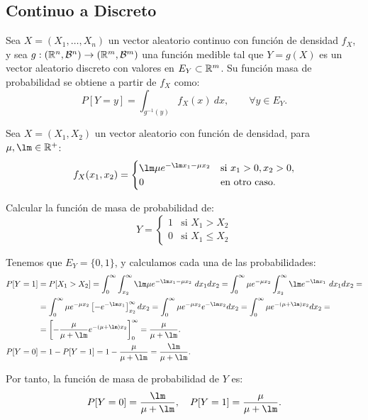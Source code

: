 \subsection{Continuo a Discreto}

Sea $X=(X_1, \ldots, X_n)$ un vector aleatorio continuo con función de densidad $f_X$, y sea $g:(\mathbb{R}^n, \mathcal{B}^n)\to (\mathbb{R}^m, \mathcal{B}^m)$ una función medible tal que $Y=g(X)$ es un vector aleatorio discreto con valores en $E_Y\subset \mathbb{R}^m$. Su función masa de probabilidad se obtiene a partir de $f_X$ como:
\begin{equation*}
    P[Y=y] = \int_{g^{-1}(y)} f_X(x)~d x,\qquad \forall y\in E_Y.
\end{equation*}


\begin{ejemplo}
    Sea $X=(X_1,X_2)$ un vector aleatorio con función de densidad, para $\mu,\lm\in \bb{R}^+$:
    \begin{equation*}
        f_X(x_1,x_2)=\begin{cases}
            \lm\mu e^{-\lm x_1-\mu x_2} &
            \text{si } x_1>0, x_2>0,\\
            0 & \text{en otro caso}.
        \end{cases}
    \end{equation*}

    Calcular la función de masa de probabilidad de:
    \begin{equation*}
        Y=\begin{cases}
            1 & \text{si } X_1>X_2 \\
            0 & \text{si } X_1\leq X_2
        \end{cases}
    \end{equation*}
    
    Tenemos que $E_Y=\{0,1\}$, y calculamos cada una de las probabilidades:
    \begin{align*}
        P[Y=1]&=P[X_1>X_2]=\int_{0}^{\infty} \int_{x_2}^{\infty} \lm\mu e^{-\lm x_1-\mu x_2}~d x_1 d x_2
        =\int_{0}^{\infty}\mu e^{-\mu x_2} \int_{x_2}^{\infty} \lm e^{-\lm x_1}~d x_1 d x_2 =
        \\&= \int_{0}^{\infty}\mu e^{-\mu x_2} \left[-e^{-\lm x_1}\right]_{x_2}^{\infty} d x_2
        = \int_{0}^{\infty}\mu e^{-\mu x_2} e^{-\lm x_2} d x_2
        = \int_{0}^{\infty}\mu e^{-(\mu+\lm) x_2} d x_2
        =\\&= \left[-\dfrac{\mu}{\mu+\lm} e^{-(\mu+\lm) x_2}\right]_{0}^{\infty}
        = \dfrac{\mu}{\mu+\lm}.\\
        P[Y=0]&=1-P[Y=1]=1-\dfrac{\mu}{\mu+\lm}=\dfrac{\lm}{\mu+\lm}.
    \end{align*}

    Por tanto, la función de masa de probabilidad de $Y$ es:
    \begin{equation*}
        P[Y=0]=\dfrac{\lm}{\mu+\lm},\quad P[Y=1]=\dfrac{\mu}{\mu+\lm}.
    \end{equation*}
\end{ejemplo}


